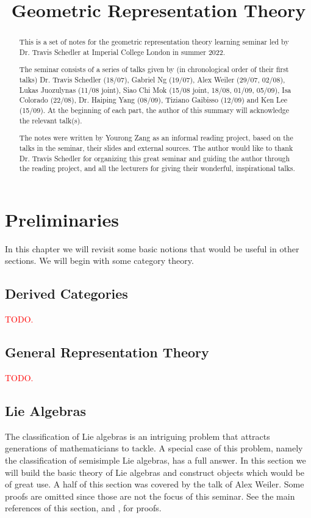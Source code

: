 \documentclass[12pt]{report}
\title{Geometric Representation Theory}
\author{}
\date{}
\theoremstyle{remark}
\theoremstyle{definition}
\begin{document}
    \maketitle
    \renewcommand{\abstractname}{Acknowledgements}
    \begin{abstract}

        This is a set of notes for the geometric representation theory learning seminar led by Dr. Travis Schedler at Imperial College London in summer 2022. 
        
        The seminar consists of a series of talks given by (in chronological order of their first talks) Dr. Travis Schedler (18/07), Gabriel Ng (19/07), Alex Weiler (29/07, 02/08), Lukas Juozulynas (11/08 joint), Siao Chi Mok (15/08 joint, 18/08, 01/09, 05/09), Isa Colorado (22/08), Dr. Haiping Yang (08/09), Tiziano Gaibisso (12/09) and Ken Lee (15/09). At the beginning of each part, the author of this summary will acknowledge the relevant talk(s). 
        
        The notes were written by Yourong Zang as an informal reading project, based on the talks in the seminar, their slides and external sources. The author would like to thank Dr. Travis Schedler for organizing this great seminar and guiding the author through the reading project, and all the lecturers for giving their wonderful, inspirational talks.
    \end{abstract}
    
    \tableofcontents
    \chapter{Preliminaries}
    In this chapter we will revisit some basic notions that would be useful in other sections. We will begin with some category theory.
    \section{Derived Categories}
    \textcolor{red}{TODO.}
    \section{General Representation Theory}
    \textcolor{red}{TODO.}
    \section{Lie Algebras}\label{sec-lie-alg}
    The classification of Lie algebras is an intriguing problem that attracts generations of mathematicians to tackle. A special case of this problem, namely the classification of semisimple Lie algebras, has a full answer. In this section we will build the basic theory of Lie algebras and construct objects which would be of great use. A half of this section was covered by the talk of Alex Weiler. Some proofs are omitted since those are not the focus of this seminar. See the main references of this section, \cite{humphreys_2010_introduction} and \cite{Humphreys2008}, for proofs.
\end{document}
